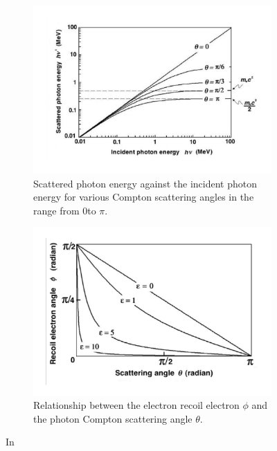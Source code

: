 \begin{figure}
\centering
\begin{subfigure}[t]{.49\textwidth}
\includegraphics[width=1.1\linewidth]{03_GraphicFiles/chapter2_GammaCameras/ComptonEnergy.pdf}
\caption{Scattered photon energy against the incident photon energy for various Compton scattering angles in the range from 0\textdegree to $\pi$.}
\label{chap2::fig::ComptonEnergy}
\end{subfigure}
\begin{subfigure}[t]{.49\textwidth}
\includegraphics[width=1.1\linewidth]{03_GraphicFiles/chapter2_GammaCameras/scattRecoilAnglesCompton.pdf}
\caption{Relationship between the electron recoil electron $\phi$ and the photon Compton scattering angle $\theta$.}
\label{chap2::fig::thetaphirel}
\end{subfigure}
\caption{In~\cite{Podgorsak2010}}
\label{chap2::fig::ComptonAngular}
\end{figure}
   
